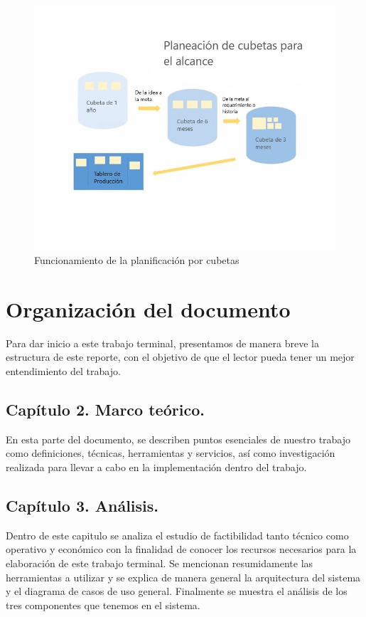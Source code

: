 \documentclass[12pt, a4paper, titlepage]{report}
\begin{document}
	    \begin{figure}[H] \caption{Funcionamiento de la planificación por cubetas}
	    	\includegraphics[width=12cm]{./imagenes/Introduccion/scrumban_buckets.jpg}
	    	\centering 
	    \end{figure}
	    
        \section{Organización del documento}
            Para dar inicio a este trabajo terminal, presentamos de manera breve la estructura de este reporte, con el objetivo de que el lector pueda tener un mejor entendimiento del trabajo.
            

            \subsection{Capítulo 2. Marco teórico.}
                En esta parte del documento, se describen puntos esenciales de nuestro trabajo como definiciones, técnicas, herramientas y servicios, así como investigación realizada para llevar a cabo en la implementación dentro del trabajo. 
             
            \subsection{Capítulo 3. Análisis.}
                Dentro de este capitulo se analiza el estudio de factibilidad tanto t\'ecnico como operativo y económico con la finalidad de conocer los recursos necesarios para la elaboración de este trabajo terminal. Se mencionan resumidamente las herramientas a utilizar y se explica de manera general la arquitectura del sistema  y el diagrama de casos de uso general. Finalmente se muestra el análisis de los tres componentes que tenemos en el sistema.
             
\end{document}
